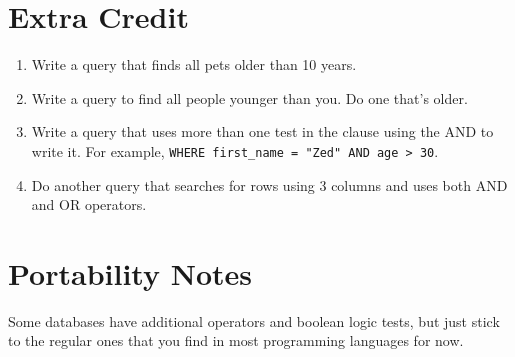 \section{Extra Credit}

\begin{enumerate}
\item Write a query that finds all pets older than 10 years.
\item Write a query to find all people younger than you.  Do one that's older.
\item Write a query that uses more than one test in the  clause using
    the AND to write it.  For example, \verb|WHERE first_name = "Zed" AND age > 30|.
\item Do another query that searches for rows using 3 columns and uses both AND
    and OR operators.
\end{enumerate}

\section{Portability Notes}

Some databases have additional operators and boolean logic tests, but just
stick to the regular ones that you find in most programming languages for now.

